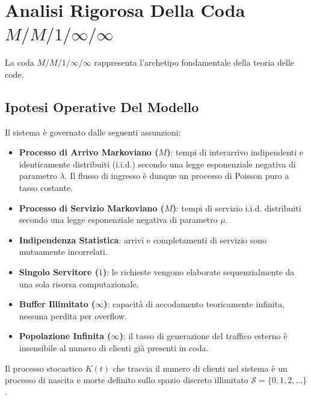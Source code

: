 \documentclass[11pt, a4paper]{article}
\begin{document}
\newpage


\section{Analisi Rigorosa Della Coda \texorpdfstring{$M/M/1/\infty/\infty$}{M/M/1}}

La coda $M/M/1/\infty/\infty$ rappresenta l'archetipo fondamentale della teoria delle code.

\subsection{Ipotesi Operative Del Modello}

Il sistema è governato dalle seguenti assunzioni:
\begin{itemize}[leftmargin=*]
    \item \textbf{Processo di Arrivo Markoviano ($M$)}: tempi di interarrivo indipendenti e identicamente distribuiti (i.i.d.) secondo una legge esponenziale negativa di parametro $\lambda$. Il flusso di ingresso è dunque un processo di Poisson puro a tasso costante.
    \item \textbf{Processo di Servizio Markoviano ($M$)}: tempi di servizio i.i.d. distribuiti secondo una legge esponenziale negativa di parametro $\mu$.
    \item \textbf{Indipendenza Statistica}: arrivi e completamenti di servizio sono mutuamente incorrelati.
    \item \textbf{Singolo Servitore ($1$)}: le richieste vengono elaborate sequenzialmente da una sola risorsa computazionale.
    \item \textbf{Buffer Illimitato ($\infty$)}: capacità di accodamento teoricamente infinita, nessuna perdita per overflow.
    \item \textbf{Popolazione Infinita ($\infty$)}: il tasso di generazione del traffico esterno è insensibile al numero di clienti già presenti in coda.
\end{itemize}

Il processo stocastico $K(t)$ che traccia il numero di clienti nel sistema è un processo di nascita e morte definito sullo spazio discreto illimitato $\mathcal{S} = \{0, 1, 2, \dots\}$.

\end{document}
